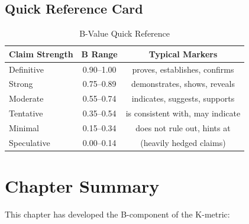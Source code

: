 \documentclass[11pt,a4paper]{article}
\theoremstyle{remark}
\begin{document}
\subsection{Quick Reference Card}

\begin{table}[h]
\centering
\caption{B-Value Quick Reference}
\label{tab:quick-ref}
\begin{tabular}{lcc}
\toprule
\textbf{Claim Strength} & \textbf{B Range} & \textbf{Typical Markers} \\
\midrule
Definitive & 0.90--1.00 & proves, establishes, confirms \\
Strong & 0.75--0.89 & demonstrates, shows, reveals \\
Moderate & 0.55--0.74 & indicates, suggests, supports \\
Tentative & 0.35--0.54 & is consistent with, may indicate \\
Minimal & 0.15--0.34 & does not rule out, hints at \\
Speculative & 0.00--0.14 & (heavily hedged claims) \\
\bottomrule
\end{tabular}
\end{table}


\section{Chapter Summary}
\label{sec:summary}

This chapter has developed the B-component of the K-metric:
\end{document}
